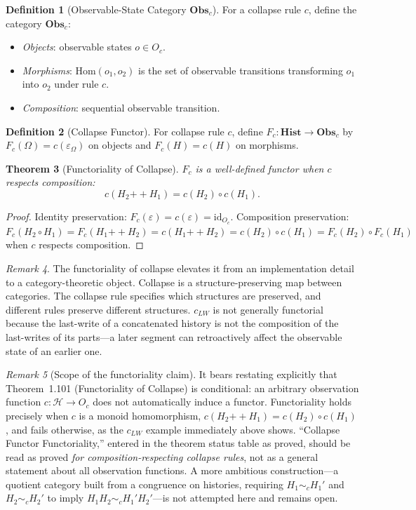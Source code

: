 \documentclass[12pt, a4paper, openany]{book}
\theoremstyle{plain}
\newtheorem{theorem}{Theorem}[chapter]
\theoremstyle{definition}
\newtheorem{definition}[theorem]{Definition}
\theoremstyle{remark}
\newtheorem{remark}[theorem]{Remark}
\newcommand{\Hist}{\mathbf{Hist}}
\newcommand{\Obs}{\mathbf{Obs}}
\newcommand{\calH}{\mathcal{H}}
\begin{document}
\begin{definition}[Observable-State Category $\Obs_c$]
For a collapse rule $c$, define the category $\Obs_c$:
\begin{itemize}
\item \textit{Objects}: observable states $o \in O_c$.
\item \textit{Morphisms}: $\mathrm{Hom}(o_1, o_2)$ is the set of observable
transitions transforming $o_1$ into $o_2$ under rule $c$.
\item \textit{Composition}: sequential observable transition.
\end{itemize}
\end{definition}

\begin{definition}[Collapse Functor]
For collapse rule $c$, define $F_c : \Hist \to \Obs_c$ by
$F_c(\Omega) = c(\varepsilon_\Omega)$ on objects and $F_c(H) = c(H)$ on morphisms.
\end{definition}

\begin{theorem}[Functoriality of Collapse]
$F_c$ is a well-defined functor when $c$ respects composition:
\[
c(H_2 \mathbin{++} H_1) = c(H_2) \circ c(H_1).
\]
\end{theorem}

\begin{proof}
Identity preservation: $F_c(\varepsilon) = c(\varepsilon) = \mathrm{id}_{O_c}$.
Composition preservation: $F_c(H_2 \circ H_1) = F_c(H_1 \mathbin{++} H_2) =
c(H_1 \mathbin{++} H_2) = c(H_2) \circ c(H_1) = F_c(H_2) \circ F_c(H_1)$ when
$c$ respects composition.
\end{proof}

\begin{remark}
The functoriality of collapse elevates it from an implementation detail to a
category-theoretic object. Collapse is a structure-preserving map between
categories. The collapse rule specifies which structures are preserved, and
different rules preserve different structures. $c_{LW}$ is not generally functorial
because the last-write of a concatenated history is not the composition of the
last-writes of its parts---a later segment can retroactively affect the observable
state of an earlier one.
\end{remark}

\begin{remark}[Scope of the functoriality claim]
It bears restating explicitly that Theorem~1.101 (Functoriality of Collapse) is
conditional: an arbitrary observation function $c : \calH \to O_c$ does not
automatically induce a functor. Functoriality holds precisely when $c$ is a
monoid homomorphism, $c(H_2 \mathbin{++} H_1) = c(H_2) \circ c(H_1)$, and fails
otherwise, as the $c_{LW}$ example immediately above shows. ``Collapse Functor
Functoriality,'' entered in the theorem status table as proved, should be read
as proved \emph{for composition-respecting collapse rules}, not as a general
statement about all observation functions. A more ambitious construction---a
quotient category built from a congruence on histories, requiring
$H_1 \sim_c H_1'$ and $H_2 \sim_c H_2'$ to imply $H_1 H_2 \sim_c H_1' H_2'$---is
not attempted here and remains open.
\end{remark}
\end{document}
